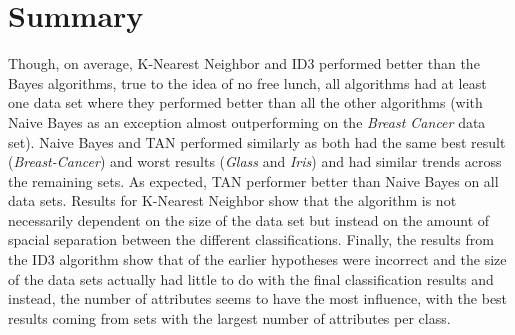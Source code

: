 \section{Summary} \label{summary}
Though, on average, K-Nearest Neighbor and ID3 performed better than the Bayes algorithms, true to the idea of no free lunch, all algorithms had at least one data set where they performed better than all the other algorithms (with Naive Bayes as an exception almost outperforming on the \textit{Breast Cancer} data set).
Naive Bayes and TAN performed similarly as both had the same best result (\textit{Breast-Cancer}) and worst results (\textit{Glass} and \textit{Iris}) and had similar trends across the remaining sets. 
As expected, TAN performer better than Naive Bayes on all data sets.
Results for K-Nearest Neighbor show that the algorithm is not necessarily dependent on the size of the data set but instead on the amount of spacial separation between the different classifications. 
Finally, the results from the ID3 algorithm show that of the earlier hypotheses were incorrect and the size of the data sets actually had little to do with the final classification results and instead, the number of attributes seems to have the most influence, with the best results coming from sets with the largest number of attributes per class. 
